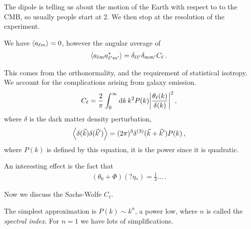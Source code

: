 \documentclass[main.tex]{subfiles}
\begin{document}
The dipole is telling us about the motion of the Earth with respect to to the CMB, so usually people start at 2. We then stop at the resolution of the experiment. 

We have \(\expval{a_{\ell m}} = 0\), however
the angular average of 
%
\begin{align}
\expval{a_{\ell m } a^{*}_{\ell' m'}} = \delta_{\ell \ell'} \delta_{m m'} C_\ell
\,.
\end{align}

This comes from the orthonormality, and the requirement of statistical isotropy.    
We account for the complications arising from galaxy emission.
%
\begin{align}
C_\ell = \frac{2}{\pi } \int_{0}^{ \infty } \dd{k} k^2 P(k) \abs{\frac{\theta_{\ell} (k)}{ \delta (k)}}^2
\,,
\end{align}
%
where \(\delta \) is the dark matter density perturbation,
%
\begin{align}
\expval{ \delta (\vec{k}) \delta (\vec{k}')} =
(2 \pi )^3 \delta^{(3)} (\vec{k} + \vec{k}') P(k)
\,,
\end{align}
%
where \(P(k)\) is defined by this equation, it is the power since it is quadratic.

An interesting effect is the fact that 
%
\begin{align}
(\theta_0 + \Phi ) ( ? \eta_{*}) = \frac{1}{3} \dots
\,.
\end{align}

Now we discuss the Sachs-Wolfe \(C_\ell\). 

The simplest approximation is \(P(k) \sim k^{n}\), a power low, where \(n\) is called the \emph{spectral index}. 
For \(n=1\) we have lots of simplifications. 
\end{document}
